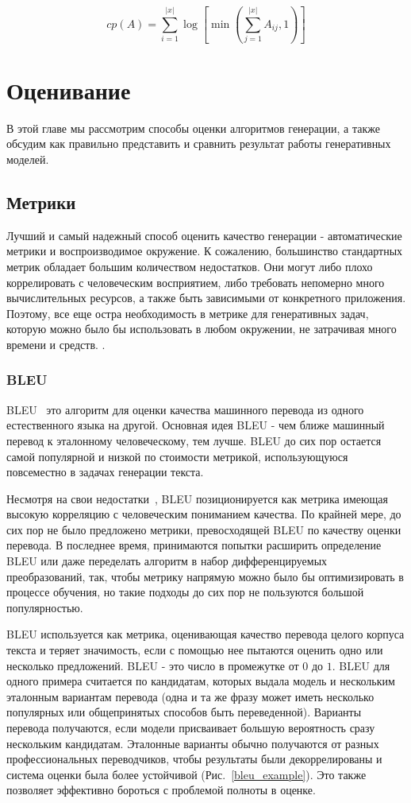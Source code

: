 \documentclass{spbau-diploma}
\begin{document}
\begin{equation}
\label{coverage_penalty}
cp(A) = \sum\limits^{|x|}_{i=1}{\log \left[\min(\sum\limits^{|x|}_{j=1}{A_{ij}}, 1) \right]}
\end{equation}

\section{Оценивание}
В этой главе мы рассмотрим способы оценки алгоритмов генерации, а 
также обсудим как правильно представить и сравнить результат работы 
генеративных моделей.

\subsection{Метрики}
Лучший и самый надежный способ оценить качество генерации - автоматические 
метрики и воспроизводимое окружение. К сожалению, большинство стандартных метрик
обладает большим количеством недостатков. Они могут либо плохо коррелировать
с человеческим восприятием, либо требовать непомерно много вычислительных 
ресурсов, а также быть зависимыми от конкретного приложения. Поэтому, все еще остра
необходимость в метрике для генеративных задач, которую можно было бы 
использовать в любом окружении, не затрачивая много времени и средств.
\cite{book:salp}.

\subsubsection{BLEU}
BLEU~\cite{bleu} это алгоритм для оценки качества машинного перевода из одного естественного
языка на другой. Основная идея BLEU - чем ближе машинный перевод к эталонному
человеческому, тем лучше. BLEU до сих пор остается самой популярной и низкой
по стоимости метрикой, использующуюся повсеместно в задачах генерации текста.

Несмотря на свои недостатки~\cite{bleu_critique}, BLEU позиционируется как 
метрика имеющая высокую корреляцию с человеческим пониманием качества. По 
крайней мере, до сих пор не было предложено метрики, превосходящей BLEU по 
качеству оценки перевода. В последнее время, принимаются попытки расширить 
определение BLEU или даже переделать алгоритм в набор дифференцируемых
преобразований, так, чтобы метрику напрямую можно было бы оптимизировать в 
процессе обучения, но такие подходы до сих пор не пользуются большой 
популярностью.

BLEU используется как метрика, оценивающая качество перевода целого корпуса 
текста и теряет значимость, если с помощью нее пытаются оценить одно или
несколько предложений. BLEU - это число в промежутке от $0$ до $1$. BLEU для 
одного примера считается по кандидатам, которых выдала модель и нескольким
эталонным вариантам перевода (одна и та же фразу может иметь несколько 
популярных или общепринятых способов быть переведенной). Варианты перевода 
получаются, если модели присваивает большую вероятность сразу нескольким кандидатам. 
Эталонные варианты обычно получаются от разных профессиональных переводчиков, чтобы 
результаты были декоррелированы и система оценки была более устойчивой 
(Рис.~\ref{bleu_example}). Это также позволяет эффективно бороться с проблемой
полноты в оценке.
\end{document}
